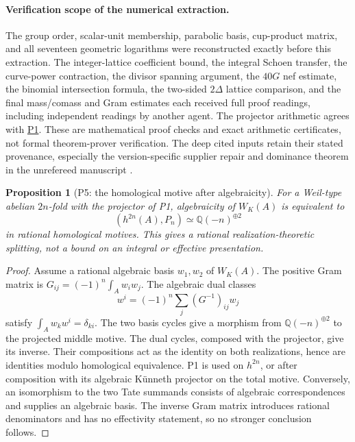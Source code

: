 \documentclass[11pt,a4paper]{article}
\newtheorem{proposition}[theorem]{Proposition}
\theoremstyle{definition}\newtheorem{definition}[theorem]{Definition}
\theoremstyle{remark}\newtheorem{remark}[theorem]{Remark}
\newcommand{\Q}{\mathbb Q}\newcommand{\Z}{\mathbb Z}\newcommand{\C}{\mathbb C}\newcommand{\R}{\mathbb R}
\newcommand{\findingref}[1]{\hyperref[#1]{\textsf{#1}}}
\begin{document}
\paragraph{Verification scope of the numerical extraction.}
The group order, scalar-unit membership, parabolic basis, cup-product matrix, and all seventeen geometric logarithms were reconstructed exactly before this extraction. The integer-lattice coefficient bound, the integral Schoen transfer, the curve-power contraction, the divisor spanning argument, the $40G$ nef estimate, the binomial intersection formula, the two-sided $2\Delta$ lattice comparison, and the final mass/comass and Gram estimates each received full proof readings, including independent readings by another agent. The projector arithmetic agrees with \findingref{P1}. These are mathematical proof checks and exact arithmetic certificates, not formal theorem-prover verification. The deep cited inputs retain their stated provenance, especially the version-specific supplier repair and dominance theorem in the unrefereed manuscript \citet{Severn26}.



\begin{proposition}[P5: the homological motive after algebraicity]\label{P5}
For a Weil-type abelian $2n$-fold with the projector of P1, algebraicity of $W_K(A)$ is equivalent to
\[
 (h^{2n}(A),P_n)\simeq\Q(-n)^{\oplus2}
\]
in rational homological motives. This gives a rational realization-theoretic splitting, not a bound on an integral or effective presentation.
\end{proposition}
\begin{proof}
Assume a rational algebraic basis $w_1,w_2$ of $W_K(A)$. The positive Gram matrix is $G_{ij}=(-1)^n\int_Aw_iw_j$. The algebraic dual classes
\[
 w^i=(-1)^n\sum_j(G^{-1})_{ij}w_j
\]
satisfy $\int_Aw_kw^i=\delta_{ki}$. The two basis cycles give a morphism from $\Q(-n)^{\oplus2}$ to the projected middle motive. The dual cycles, composed with the projector, give its inverse. Their compositions act as the identity on both realizations, hence are identities modulo homological equivalence. P1 is used on $h^{2n}$, or after composition with its algebraic K\"unneth projector on the total motive. Conversely, an isomorphism to the two Tate summands consists of algebraic correspondences and supplies an algebraic basis. The inverse Gram matrix introduces rational denominators and has no effectivity statement, so no stronger conclusion follows.
\end{proof}
\end{document}
